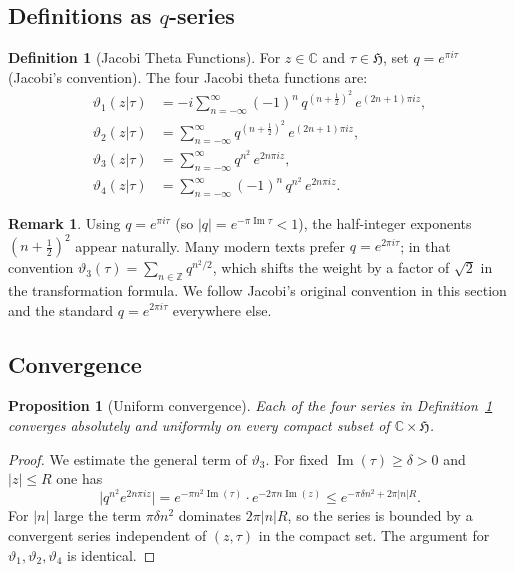 \documentclass[12pt,a4paper]{amsart}
\newtheorem{proposition}[theorem]{Proposition}
\theoremstyle{definition}
\newtheorem{definition}[theorem]{Definition}
\newtheorem{remark}[theorem]{Remark}
\begin{document}
\subsection{Definitions as $q$-series}

\begin{definition}[Jacobi Theta Functions]\label{def:jacobi}
For $z \in \mathbb{C}$ and $\tau \in \mathfrak{H}$, set $q = e^{\pi i \tau}$
(Jacobi's convention). The four Jacobi theta functions are:
\begin{align}
  \vartheta_1(z|\tau) &= -i \sum_{n=-\infty}^{\infty}
    (-1)^n\, q^{(n+\tfrac{1}{2})^2}\, e^{(2n+1)\pi iz},
    \label{eq:theta1}\\
  \vartheta_2(z|\tau) &= \sum_{n=-\infty}^{\infty}
    q^{(n+\tfrac{1}{2})^2}\, e^{(2n+1)\pi iz},
    \label{eq:theta2}\\
  \vartheta_3(z|\tau) &= \sum_{n=-\infty}^{\infty}
    q^{n^2}\, e^{2n\pi iz},
    \label{eq:theta3}\\
  \vartheta_4(z|\tau) &= \sum_{n=-\infty}^{\infty}
    (-1)^n\, q^{n^2}\, e^{2n\pi iz}.
    \label{eq:theta4}
\end{align}
\end{definition}

\begin{remark}
Using $q = e^{\pi i\tau}$ (so $|q| = e^{-\pi\operatorname{Im}\tau} < 1$),
the half-integer exponents $(n+\frac12)^2$ appear naturally.
Many modern texts prefer $q = e^{2\pi i\tau}$; in that convention
$\vartheta_3(\tau) = \sum_{n\in\mathbb{Z}} q^{n^2/2}$,
which shifts the weight by a factor of $\sqrt{2}$ in the transformation formula.
We follow Jacobi's original convention in this section and the standard
$q = e^{2\pi i\tau}$ everywhere else.
\end{remark}

\subsection{Convergence}

\begin{proposition}[Uniform convergence]\label{prop:convergence}
Each of the four series in Definition~\ref{def:jacobi} converges absolutely and
uniformly on every compact subset of $\mathbb{C} \times \mathfrak{H}$.
\end{proposition}

\begin{proof}
We estimate the general term of $\vartheta_3$.  For fixed $\operatorname{Im}(\tau) \geq \delta > 0$
and $|z| \leq R$ one has
\[
  \bigl|q^{n^2} e^{2n\pi iz}\bigr|
  = e^{-\pi n^2 \operatorname{Im}(\tau)} \cdot e^{-2\pi n \operatorname{Im}(z)}
  \leq e^{-\pi \delta n^2 + 2\pi |n| R}.
\]
For $|n|$ large the term $\pi\delta n^2$ dominates $2\pi|n|R$, so the series is bounded
by a convergent series independent of $(z,\tau)$ in the compact set.
The argument for $\vartheta_1, \vartheta_2, \vartheta_4$ is identical.
\end{proof}
\end{document}
